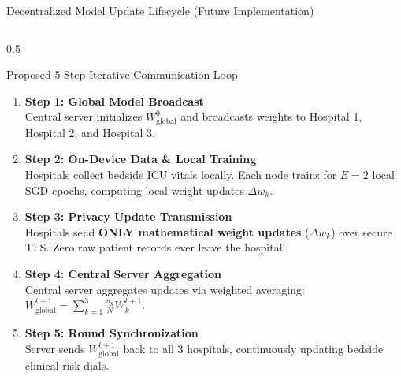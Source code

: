 \documentclass[aspectratio=169, 11pt]{beamer}
\begin{document}
\begin{frame}{Decentralized Model Update Lifecycle (Future Implementation)}
    \begin{columns}[t]
        \begin{column}{0.5\textwidth}
            \begin{block}{Proposed 5-Step Iterative Communication Loop}
                \scriptsize
                \begin{enumerate}
                    \item \textbf{Step 1: Global Model Broadcast} \\
                    Central server initializes $W_{\text{global}}^0$ and broadcasts weights to Hospital 1, Hospital 2, and Hospital 3.
                    
                    \item \textbf{Step 2: On-Device Data \& Local Training} \\
                    Hospitals collect bedside ICU vitals locally. Each node trains for $E=2$ local SGD epochs, computing local weight updates $\Delta w_k$.
                    
                    \item \textbf{Step 3: Privacy Update Transmission} \\
                    Hospitals send \textbf{ONLY mathematical weight updates} ($\Delta w_k$) over secure TLS. Zero raw patient records ever leave the hospital!
                    
                    \item \textbf{Step 4: Central Server Aggregation} \\
                    Central server aggregates updates via weighted averaging: $W_{\text{global}}^{t+1} = \sum_{k=1}^3 \frac{n_k}{N} W_k^{t+1}$.
                    
                    \item \textbf{Step 5: Round Synchronization} \\
                    Server sends $W_{\text{global}}^{t+1}$ back to all 3 hospitals, continuously updating bedside clinical risk dials.
                \end{enumerate}
            \end{block}
        \end{column}
        

\end{columns}
\end{frame}
\end{document}
